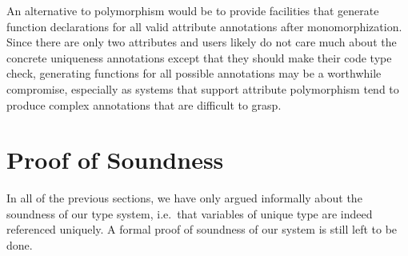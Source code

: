 An alternative to polymorphism would be to provide facilities that generate function declarations for all valid attribute annotations after monomorphization. Since there are only two attributes and users likely do not care much about the concrete uniqueness annotations except that they should make their code type check, generating functions for all possible annotations may be a worthwhile compromise, especially as systems that support attribute polymorphism tend to produce complex annotations that are difficult to grasp.

\section{Proof of Soundness}
In all of the previous sections, we have only argued informally about the soundness of our type system, i.e.\ that variables of unique type are indeed referenced uniquely. A formal proof of soundness of our system is still left to be done.
